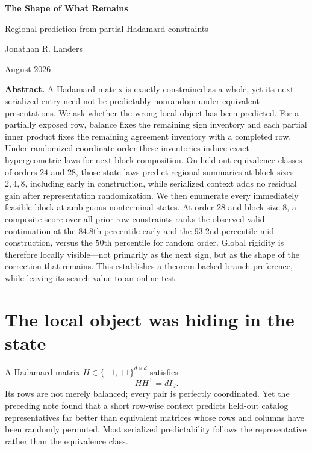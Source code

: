 \documentclass[10pt,twoside]{article}
\theoremstyle{noteplain}
\theoremstyle{definition}
\begin{document}
\begin{center}
  {\fontsize{25}{29}\selectfont\bfseries\color{MidnightBlue}The Shape of What Remains}\par\vspace{0.25em}
  {\Large Regional prediction from partial Hadamard constraints}\par\vspace{0.85em}
  {\normalsize Jonathan R. Landers}\par\vspace{0.25em}
  {\small August 2026}
\end{center}

\vspace{0.35em}
\noindent\colorbox{Mist}{%
\begin{minipage}{0.965\linewidth}
\small
\textbf{Abstract.}
A Hadamard matrix is exactly constrained as a whole, yet its next serialized entry need not be predictably nonrandom under equivalent presentations.  We ask whether the wrong local object has been predicted.  For a partially exposed row, balance fixes the remaining sign inventory and each partial inner product fixes the remaining agreement inventory with a completed row.  Under randomized coordinate order these inventories induce exact hypergeometric laws for next-block composition.  On held-out equivalence classes of orders $24$ and $28$, those state laws predict regional summaries at block sizes $2,4,8$, including early in construction, while serialized context adds no residual gain after representation randomization.  We then enumerate every immediately feasible block at ambiguous nonterminal states.  At order $28$ and block size $8$, a composite score over all prior-row constraints ranks the observed valid continuation at the $84.8$th percentile early and the $93.2$nd percentile mid-construction, versus the $50$th percentile for random order.  Global rigidity is therefore locally visible---not primarily as the next sign, but as the shape of the correction that remains.  This establishes a theorem-backed branch preference, while leaving its search value to an online test.
\end{minipage}}

\section{The local object was hiding in the state}

A Hadamard matrix $H\in\{-1,+1\}^{d\times d}$ satisfies
\begin{equation}\label{eq:hadamard}
HH^{\mathsf T}=dI_d.
\end{equation}
Its rows are not merely balanced; every pair is perfectly coordinated.  Yet the preceding note found that a short row-wise context predicts held-out catalog representatives far better than equivalent matrices whose rows and columns have been randomly permuted.  Most serialized predictability follows the representative rather than the equivalence class.
\end{document}
